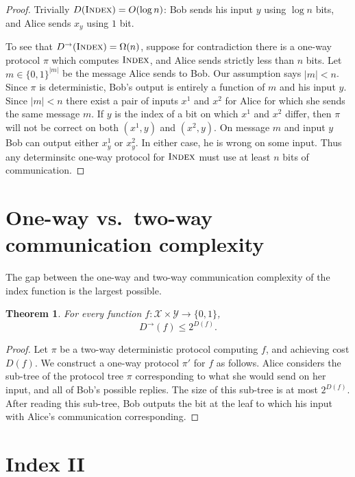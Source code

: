 \documentclass[11pt]{amsart}
\theoremstyle{plain}
\newtheorem{theorem}{Theorem}
\theoremstyle{definition}
\theoremstyle{plain}
\newcommand{\calX}{\mathcal{X}}
\newcommand{\calY}{\mathcal{Y}}
\newcommand{\Index}{\textsc{Index}}
\begin{document}
\begin{proof}
Trivially $D(\Index) = O(\log n)$: Bob sends his input $y$ using $\log n$ bits, and Alice sends $x_y$ using $1$ bit.

To see that $D^\rightarrow(\Index) = \Omega(n)$, suppose for contradiction there is a one-way protocol $\pi$ which computes $\Index$, and Alice sends strictly less than $n$ bits. Let $m\in\{0,1\}^{|m|}$ be the message Alice sends to Bob. Our assumption says $|m| < n$. Since $\pi$ is deterministic, Bob's output is entirely a function of $m$ and his input $y$. Since $|m|<n$ there exist a pair of inputs $x^1$ and $x^2$ for Alice for which she sends the same message $m$. If $y$ is the index of a bit on which $x^1$ and $x^2$ differ, then $\pi$ will not be correct on both $(x^1,y)$ and $(x^2,y)$. On message $m$ and input $y$ Bob can output either $x^1_y$ or $x^2_y$. In either case, he is wrong on some input. Thus any determinsitc one-way protocol for $\Index$ must use at least $n$ bits of communication.
\end{proof}



\newpage 
\section{One-way vs.~two-way communication complexity}

The gap between the one-way and two-way communication complexity of the index function is the largest possible.

\begin{theorem}
For every function $f : \calX \times \calY \to \{0,1\}$,
\[
D^\rightarrow(f) \le 2^{D(f)}.
\]
\end{theorem}

\begin{proof}
Let $\pi$ be a two-way deterministic protocol computing $f$, and achieving cost $D(f)$. We construct a one-way protocol $\pi'$ for $f$ as follows. Alice considers the sub-tree of the protocol tree $\pi$ corresponding to what she would send on her input, and all of Bob's possible replies. The size of this sub-tree is at most $2^{D(f)}$. After reading this sub-tree, Bob outputs the bit at the leaf to which his input with Alice's communication corresponding.
\end{proof}



\newpage 
\section{Index II}
\end{document}
